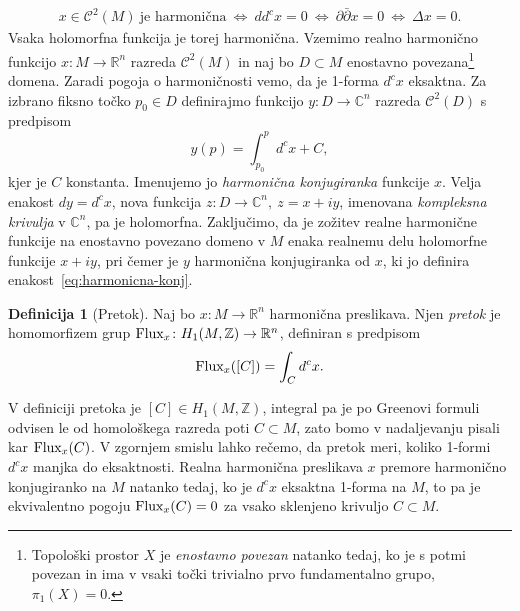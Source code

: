 \documentclass[12pt,a4paper,twoside]{article}
\theoremstyle{definition} %
\newtheorem{definicija}{Definicija}[section]
\theoremstyle{plain} %
\numberwithin{equation}{section}  %
\newcommand{\R}{\mathbb R}
\newcommand{\Z}{\mathbb Z}
\begin{document}
\begin{gather*}
x \in \mathcal{C}^2(M) \ \text{je harmonična} \ \iff \ dd^{c}x=0 \ \iff \ \partial \bar{\partial}x=0 \ \iff \ \Delta x=0.
\end{gather*}
Vsaka holomorfna funkcija je torej harmonična. 
Vzemimo realno harmonično funkcijo $x \colon M \to \mathbb{R}^{n}$ razreda $\mathcal{C}^2(M)$ in naj bo $D \subset M$ enostavno povezana\footnote{Topološki prostor $X$ je \emph{enostavno povezan} natanko tedaj, ko je s potmi povezan in ima v vsaki točki trivialno prvo fundamentalno grupo, $\pi_{1}(X)=0$.} domena. Zaradi pogoja o harmoničnosti vemo, da je 1-forma $d^{c}x$ eksaktna. Za izbrano fiksno točko $p_{0} \in D$ definirajmo funkcijo $y \colon D \to \mathbb{C}^{n}$ razreda $\mathcal{C}^2(D)$ s predpisom
\begin{equation} \label{eq:harmonicna-konj}
y(p) = \int_{p_0}^{p} d^{c}x + C,
\end{equation}
kjer je $C$ konstanta. Imenujemo jo \emph{harmonična konjugiranka} funkcije $x$. Velja enakost $dy = d^{c}x$, nova funkcija $z \colon D \to \mathbb{C}^{n}, \ z = x+iy$, imenovana \emph{kompleksna krivulja} v $\mathbb{C}^{n}$, pa je holomorfna. Zaključimo, da je zožitev realne harmonične funkcije na enostavno povezano domeno v $M$ enaka realnemu delu holomorfne funkcije $x+iy$, pri čemer je $y$ harmonična konjugiranka od $x$, ki jo definira enakost~\eqref{eq:harmonicna-konj}.

\begin{definicija} [Pretok]
Naj bo $x \colon M \to \R^{n}$ harmonična preslikava. Njen \emph{pretok} je homomorfizem grup $\textup{Flux}_{x} \colon H_{1} (M, \Z) \to \R^{n}$, definiran s predpisom 
\begin{equation} \label{eq:pretok}
\textup{Flux}_{x} ([C]) = \int_{C} {d^{c} x}.
\end{equation}
\end{definicija}
%
V definiciji pretoka je $[C] \in H_{1} (M, \Z)$, integral pa je po Greenovi formuli odvisen le od homološkega razreda poti $C \subset M$, zato bomo v nadaljevanju pisali kar $\textup{Flux}_{x} (C)$. V zgornjem smislu lahko rečemo, da pretok meri, koliko 1-formi $d^{c}x$ manjka do eksaktnosti. Realna harmonična preslikava $x$ premore harmonično konjugiranko na $M$ natanko tedaj, ko je $d^{c}x$ eksaktna 1-forma na $M$, to pa je ekvivalentno pogoju $\textup{Flux}_{x}(C)=0$ za vsako sklenjeno krivuljo $C \subset M$.

\end{document}

